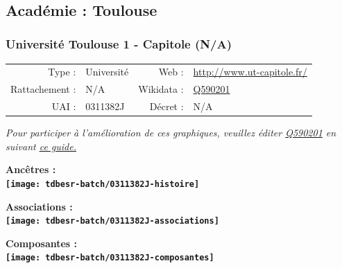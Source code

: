 \documentclass[12pt,french,]{article}
\begin{document}
\ifoddpage ~\newpage \fi   

\hypertarget{acaduxe9mie-toulouse}{%
\subsection{Académie : Toulouse}\label{acaduxe9mie-toulouse}}

\hypertarget{universituxe9-toulouse-1---capitole-na}{%
\subsubsection{Université Toulouse 1 - Capitole
(N/A)}\label{universituxe9-toulouse-1---capitole-na}}

\begin{tabular*}{\textwidth}{rp{5cm}rl}  
\hline  
Type : & Université & Web : &\href{http://www.ut-capitole.fr/}{http://www.ut-capitole.fr/} \\  
Rattachement : & N/A & Wikidata : & \href{https://www.wikidata.org/entity/Q590201}{Q590201} \\  
UAI : & 0311382J & Décret : & N/A \\  
\hline  
\end{tabular*}

\textit{\scriptsize Pour participer à l'amélioration de ces graphiques, veuillez éditer  \href{https://www.wikidata.org/entity/Q590201}{Q590201}  en suivant \href{https://github.com/cpesr/wikidataESR/blob/master/Rmd/wikidataESR.md}{ce guide.}}

\vspace{1cm}  
\begin{minipage}[b]{0.50\textwidth}\begin{center} \bf Ancêtres : \\  
\texttt{[image: tdbesr-batch/0311382J-histoire]} \end{center}\end{minipage}\begin{minipage}[b]{0.50\textwidth}\begin{center} \bf Associations : \\  
\texttt{[image: tdbesr-batch/0311382J-associations]} \end{center}\end{minipage}

\hrulefill

\begin{center} \bf Composantes : \\  
\texttt{[image: tdbesr-batch/0311382J-composantes]} \end{center}
\end{document}
